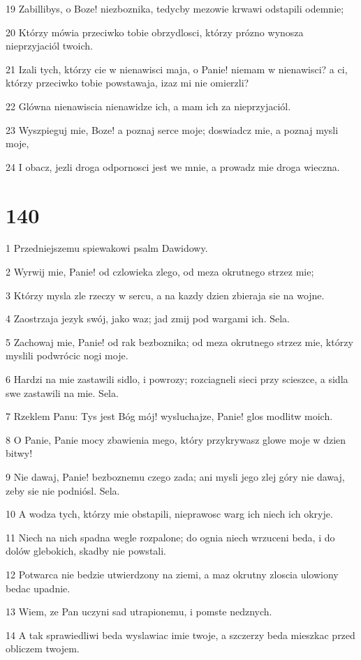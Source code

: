 \par 19 Zabillibys, o Boze! niezboznika, tedycby mezowie krwawi odstapili odemnie;
\par 20 Którzy mówia przeciwko tobie obrzydlosci, którzy prózno wynosza nieprzyjaciól twoich.
\par 21 Izali tych, którzy cie w nienawisci maja, o Panie! niemam w nienawisci? a ci, którzy przeciwko tobie powstawaja, izaz mi nie omierzli?
\par 22 Glówna nienawiscia nienawidze ich, a mam ich za nieprzyjaciól.
\par 23 Wyszpieguj mie, Boze! a poznaj serce moje; doswiadcz mie, a poznaj mysli moje,
\par 24 I obacz, jezli droga odpornosci jest we mnie, a prowadz mie droga wieczna.

\chapter{140}

\par 1 Przedniejszemu spiewakowi psalm Dawidowy.
\par 2 Wyrwij mie, Panie! od czlowieka zlego, od meza okrutnego strzez mie;
\par 3 Którzy mysla zle rzeczy w sercu, a na kazdy dzien zbieraja sie na wojne.
\par 4 Zaostrzaja jezyk swój, jako waz; jad zmij pod wargami ich. Sela.
\par 5 Zachowaj mie, Panie! od rak bezboznika; od meza okrutnego strzez mie, którzy myslili podwrócic nogi moje.
\par 6 Hardzi na mie zastawili sidlo, i powrozy; rozciagneli sieci przy scieszce, a sidla swe zastawili na mie. Sela.
\par 7 Rzeklem Panu: Tys jest Bóg mój! wysluchajze, Panie! glos modlitw moich.
\par 8 O Panie, Panie mocy zbawienia mego, który przykrywasz glowe moje w dzien bitwy!
\par 9 Nie dawaj, Panie! bezboznemu czego zada; ani mysli jego zlej góry nie dawaj, zeby sie nie podniósl. Sela.
\par 10 A wodza tych, którzy mie obstapili, nieprawosc warg ich niech ich okryje.
\par 11 Niech na nich spadna wegle rozpalone; do ognia niech wrzuceni beda, i do dolów glebokich, skadby nie powstali.
\par 12 Potwarca nie bedzie utwierdzony na ziemi, a maz okrutny zloscia ulowiony bedac upadnie.
\par 13 Wiem, ze Pan uczyni sad utrapionemu, i pomste nedznych.
\par 14 A tak sprawiedliwi beda wyslawiac imie twoje, a szczerzy beda mieszkac przed obliczem twojem.

